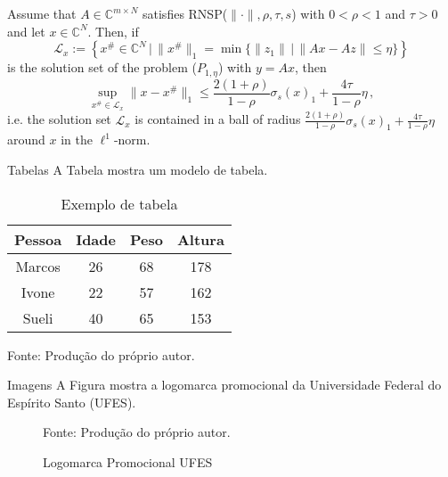 \documentclass[11pt]{beamer}
\newcommand{\CC}{\mathbb{C}}
\begin{document}
\begin{frame}{}
    \begin{Kor}
        {}{}
        Assume that \(A\in\CC^{m\times N}\) satisfies RNSP(\(\|\cdot\|,\rho,\tau,s\)) with \(0<\rho<1\) and \(\tau>0\) and let \(x\in \CC^N\). Then, if
        \[\mathcal L_x:=\left\{x^{\#}\in\CC^N\,\big|\, \|x^{\#}\|_1=\min\{\|z_1\|\,|\,\|Ax-Az\|\le \eta\}\right\}\]
        is the solution set of the problem ($P_{1,\eta}$) with \(y=Ax\), then 
        \[\sup_{x^{\#}\in \mathcal L_x}\|x-x^{\#}\|_1\le \frac{2(1+\rho)}{1-\rho}\sigma_s(x)_1+\frac{4\tau}{1-\rho}\eta\,,\]
        i.e. the solution set \(\mathcal L_x\) is contained in a ball of radius \(\frac{2(1+\rho)}{1-\rho}\sigma_s(x)_1+\frac{4\tau}{1-\rho}\eta\) around \(x\) in the \(\ell^1\)-norm.
    \end{Kor}
\end{frame}

\begin{frame}{Tabelas}
    A Tabela mostra um modelo de tabela.

    \begin{table}[htb]
        \caption{Exemplo de tabela}
        \label{tab:modelo_tabela}
        \centering
        \begin{tabular}{c|c|c|c}
	        \hline
	        \textbf{Pessoa} & \textbf{Idade} & \textbf{Peso} & \textbf{Altura} \\ \hline
	        Marcos & 26    & 68   & 178    \\ \hline
	        Ivone  & 22    & 57   & 162    \\ \hline
	        Sueli  & 40    & 65   & 153    \\ \hline
        \end{tabular}
        
        \medskip
        
        Fonte: Produção do próprio autor.
    \end{table}
\end{frame}

\begin{frame}{Imagens}
    A Figura mostra a logomarca promocional da Universidade Federal do Espírito Santo (UFES).
    
    \begin{figure}[htb]
        \caption{Logomarca Promocional UFES}
        \label{fig:logo_UFES}
        \centering
        
        \medskip
        
        Fonte: Produção do próprio autor.
    \end{figure}
\end{frame}
\end{document}
